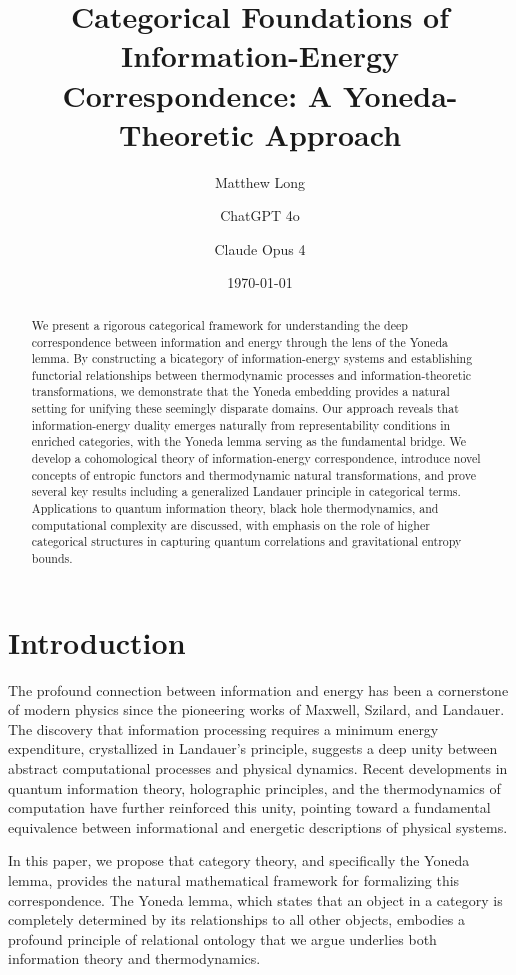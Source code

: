 \documentclass[12pt]{article}
\title{Categorical Foundations of Information-Energy Correspondence: A Yoneda-Theoretic Approach}
\author[1]{Matthew Long}
\author[2]{ChatGPT 4o}
\author[3]{Claude Opus 4}
\affil[1]{Yoneda AI}
\affil[2]{OpenAI}
\affil[3]{Anthropic}
\date{\today}
\begin{document}
\maketitle

\begin{abstract}
We present a rigorous categorical framework for understanding the deep correspondence between information and energy through the lens of the Yoneda lemma. By constructing a bicategory of information-energy systems and establishing functorial relationships between thermodynamic processes and information-theoretic transformations, we demonstrate that the Yoneda embedding provides a natural setting for unifying these seemingly disparate domains. Our approach reveals that information-energy duality emerges naturally from representability conditions in enriched categories, with the Yoneda lemma serving as the fundamental bridge. We develop a cohomological theory of information-energy correspondence, introduce novel concepts of entropic functors and thermodynamic natural transformations, and prove several key results including a generalized Landauer principle in categorical terms. Applications to quantum information theory, black hole thermodynamics, and computational complexity are discussed, with emphasis on the role of higher categorical structures in capturing quantum correlations and gravitational entropy bounds.
\end{abstract}

\section{Introduction}

The profound connection between information and energy has been a cornerstone of modern physics since the pioneering works of Maxwell, Szilard, and Landauer. The discovery that information processing requires a minimum energy expenditure, crystallized in Landauer's principle, suggests a deep unity between abstract computational processes and physical dynamics. Recent developments in quantum information theory, holographic principles, and the thermodynamics of computation have further reinforced this unity, pointing toward a fundamental equivalence between informational and energetic descriptions of physical systems.

In this paper, we propose that category theory, and specifically the Yoneda lemma, provides the natural mathematical framework for formalizing this correspondence. The Yoneda lemma, which states that an object in a category is completely determined by its relationships to all other objects, embodies a profound principle of relational ontology that we argue underlies both information theory and thermodynamics.
\end{document}
